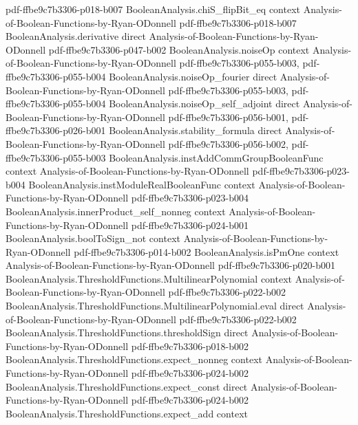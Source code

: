 \begin{theorem}
  {pdf-ffbe9c7b3306-p018-b007}
\proofstep
  {BooleanAnalysis.chiS_flipBit_eq}
  {context}
  {Analysis-of-Boolean-Functions-by-Ryan-ODonnell}
  {pdf-ffbe9c7b3306-p018-b007}
\proofstep
  {BooleanAnalysis.derivative}
  {direct}
  {Analysis-of-Boolean-Functions-by-Ryan-ODonnell}
  {pdf-ffbe9c7b3306-p047-b002}
\proofstep
  {BooleanAnalysis.noiseOp}
  {context}
  {Analysis-of-Boolean-Functions-by-Ryan-ODonnell}
  {pdf-ffbe9c7b3306-p055-b003,
    pdf-ffbe9c7b3306-p055-b004}
\proofstep
  {BooleanAnalysis.noiseOp_fourier}
  {direct}
  {Analysis-of-Boolean-Functions-by-Ryan-ODonnell}
  {pdf-ffbe9c7b3306-p055-b003,
    pdf-ffbe9c7b3306-p055-b004}
\proofstep
  {BooleanAnalysis.noiseOp_self_adjoint}
  {direct}
  {Analysis-of-Boolean-Functions-by-Ryan-ODonnell}
  {pdf-ffbe9c7b3306-p056-b001,
    pdf-ffbe9c7b3306-p026-b001}
\proofstep
  {BooleanAnalysis.stability_formula}
  {direct}
  {Analysis-of-Boolean-Functions-by-Ryan-ODonnell}
  {pdf-ffbe9c7b3306-p056-b002,
    pdf-ffbe9c7b3306-p055-b003}
\proofstep
  {BooleanAnalysis.instAddCommGroupBooleanFunc}
  {context}
  {Analysis-of-Boolean-Functions-by-Ryan-ODonnell}
  {pdf-ffbe9c7b3306-p023-b004}
\proofstep
  {BooleanAnalysis.instModuleRealBooleanFunc}
  {context}
  {Analysis-of-Boolean-Functions-by-Ryan-ODonnell}
  {pdf-ffbe9c7b3306-p023-b004}
\proofstep
  {BooleanAnalysis.innerProduct_self_nonneg}
  {context}
  {Analysis-of-Boolean-Functions-by-Ryan-ODonnell}
  {pdf-ffbe9c7b3306-p024-b001}
\proofstep
  {BooleanAnalysis.boolToSign_not}
  {context}
  {Analysis-of-Boolean-Functions-by-Ryan-ODonnell}
  {pdf-ffbe9c7b3306-p014-b002}
\proofstep
  {BooleanAnalysis.isPmOne}
  {context}
  {Analysis-of-Boolean-Functions-by-Ryan-ODonnell}
  {pdf-ffbe9c7b3306-p020-b001}
\proofstep
  {BooleanAnalysis.ThresholdFunctions.MultilinearPolynomial}
  {context}
  {Analysis-of-Boolean-Functions-by-Ryan-ODonnell}
  {pdf-ffbe9c7b3306-p022-b002}
\proofstep
  {BooleanAnalysis.ThresholdFunctions.MultilinearPolynomial.eval}
  {direct}
  {Analysis-of-Boolean-Functions-by-Ryan-ODonnell}
  {pdf-ffbe9c7b3306-p022-b002}
\proofstep
  {BooleanAnalysis.ThresholdFunctions.thresholdSign}
  {direct}
  {Analysis-of-Boolean-Functions-by-Ryan-ODonnell}
  {pdf-ffbe9c7b3306-p018-b002}
\proofstep
  {BooleanAnalysis.ThresholdFunctions.expect_nonneg}
  {context}
  {Analysis-of-Boolean-Functions-by-Ryan-ODonnell}
  {pdf-ffbe9c7b3306-p024-b002}
\proofstep
  {BooleanAnalysis.ThresholdFunctions.expect_const}
  {direct}
  {Analysis-of-Boolean-Functions-by-Ryan-ODonnell}
  {pdf-ffbe9c7b3306-p024-b002}
\proofstep
  {BooleanAnalysis.ThresholdFunctions.expect_add}
  {context}

\end{theorem}

